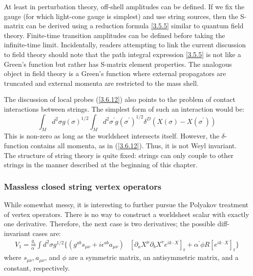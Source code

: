 At least in perturbation theory, off-shell amplitudes can be defined. If we fix the gauge (for which light-cone gauge is simplest) and use string sources, then the S-matrix can be derived using a reduction formula \eqref{3.5.5} similar to quantum field theory. Finite-time transition amplitudes can be defined before taking the infinite-time limit. Incidentally, readers attempting to link the current discussion to field theory should note that the path integral expression \eqref{3.5.5} is not like a Green's function but rather has S-matrix element properties. The analogous object in field theory is a Green's function where external propagators are truncated and external momenta are restricted to the mass shell.

The discussion of local probes (\ref{3.6.12}) also points to the problem of contact interactions between strings. The simplest form of such an interaction would be:
\begin{equation}
	\int_{M} d^{2} \sigma g(\sigma)^{1 / 2} \int_{M} d^{2} \sigma^{\prime} g\left(\sigma^{\prime}\right)^{1 / 2} \delta^{D}\left(X(\sigma)-X\left(\sigma^{\prime}\right)\right)
\end{equation}
This is non-zero as long as the worldsheet intersects itself. However, the $\delta$-function contains all momenta, as in (\ref{3.6.12}). Thus, it is not Weyl invariant. The structure of string theory is quite fixed: strings can only couple to other strings in the manner described at the beginning of this chapter.

\subsubsection*{\Large Massless closed string vertex operators}

While somewhat messy, it is interesting to further pursue the Polyakov treatment of vertex operators. There is no way to construct a worldsheet scalar with exactly one derivative. Therefore, the next case is two derivatives; the possible diff-invariant cases are:
\begin{equation}\label{3.6.14}
\begin{aligned}
		V_{1}=\frac{g_{\mathrm{c}}}{\alpha^{\prime}} \int d^{2} \sigma g^{1 / 2}\Big\{\left(g^{a b} s_{\mu \nu}+i \epsilon^{a b} a_{\mu \nu}\right)&\left[\partial_{a} X^{\mu} \partial_{b} X^{v} e^{i k \cdot X}\right]_{\mathrm{r}}+\alpha^{\prime} \phi R\left[e^{i k \cdot X}\right]_{\mathrm{r}}\Big\}
\end{aligned}
\end{equation}
where $s_{\mu \nu}, a_{\mu \nu}$, and $\phi$ are a symmetric matrix, an antisymmetric matrix, and a constant, respectively.

